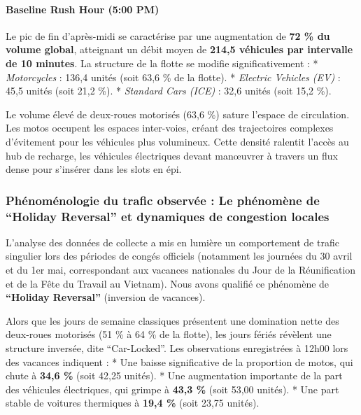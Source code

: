 \documentclass[10pt, a4paper]{article}
\begin{document}
\paragraph{Baseline Rush Hour (5:00
PM)}\label{baseline-rush-hour-500-pm}

Le pic de fin d'après-midi se caractérise par une augmentation de
\textbf{72 \% du volume global}, atteignant un débit moyen de
\textbf{214,5 véhicules par intervalle de 10 minutes}. La structure de
la flotte se modifie significativement : * \emph{Motorcycles} : 136,4
unités (soit 63,6 \% de la flotte). * \emph{Electric Vehicles (EV)} :
45,5 unités (soit 21,2 \%). * \emph{Standard Cars (ICE)} : 32,6 unités
(soit 15,2 \%).

Le volume élevé de deux-roues motorisés (63,6 \%) sature l'espace de
circulation. Les motos occupent les espaces inter-voies, créant des
trajectoires complexes d'évitement pour les véhicules plus volumineux.
Cette densité ralentit l'accès au hub de recharge, les véhicules
électriques devant manœuvrer à travers un flux dense pour s'insérer dans
les slots en épi.

\subsubsection{Phénoménologie du trafic observée : Le phénomène de
``Holiday Reversal'' et dynamiques de congestion
locales}\label{phuxe9nomuxe9nologie-du-trafic-observuxe9e-le-phuxe9nomuxe8ne-de-holiday-reversal-et-dynamiques-de-congestion-locales}

L'analyse des données de collecte a mis en lumière un comportement de
trafic singulier lors des périodes de congés officiels (notamment les
journées du 30 avril et du 1er mai, correspondant aux vacances
nationales du Jour de la Réunification et de la Fête du Travail au
Vietnam). Nous avons qualifié ce phénomène de \textbf{``Holiday
Reversal''} (inversion de vacances).

Alors que les jours de semaine classiques présentent une domination
nette des deux-roues motorisés (51 \% à 64 \% de la flotte), les jours
fériés révèlent une structure inversée, dite ``Car-Locked''. Les
observations enregistrées à 12h00 lors des vacances indiquent : * Une
baisse significative de la proportion de motos, qui chute à \textbf{34,6
\%} (soit 42,25 unités). * Une augmentation importante de la part des
véhicules électriques, qui grimpe à \textbf{43,3 \%} (soit 53,00
unités). * Une part stable de voitures thermiques à \textbf{19,4 \%}
(soit 23,75 unités).
\end{document}
